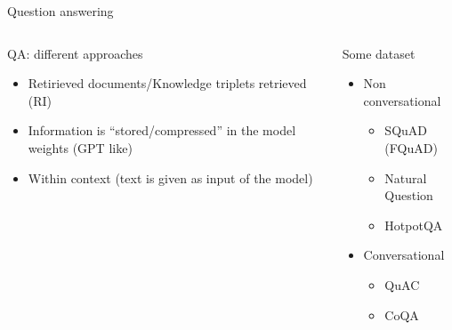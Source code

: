 \documentclass[10pt,aspectratio=169]{beamer}
\begin{document}
\begin{frame}{Question answering}
    \begin{columns}
        \begin{column}{0.5\textwidth}
            \begin{block}{QA: different approaches}
                \begin{itemize}
                    \item Retirieved documents/Knowledge triplets retrieved (RI)
                    \item Information is ``stored/compressed'' in the model weights (GPT like)
                    \item Within context (text is given as input of the model)
                \end{itemize}
            \end{block}
        \end{column}
        \begin{column}{0.5\textwidth}   
            \begin{block}{Some dataset}
                \begin{itemize}
                    \item Non conversational 
                        \begin{itemize}
                            \item SQuAD (FQuAD)
                            \item Natural Question
                            \item HotpotQA
                        \end{itemize}
                    \item Conversational 
                        \begin{itemize}
                            \item QuAC 
                            \item CoQA
                        \end{itemize}
                \end{itemize}
            \end{block}
        \end{column}
    \end{columns}
\end{frame}
\end{document}
